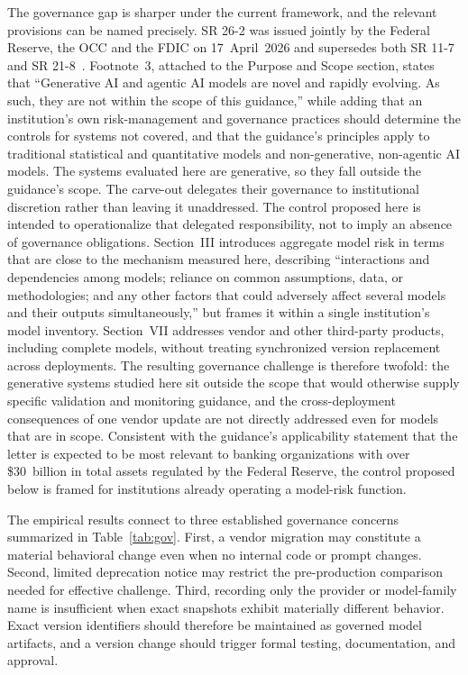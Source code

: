 \documentclass{ieeeaccess}
\begin{document}
The governance gap is sharper under the current framework, and the relevant provisions can be named precisely. SR 26-2 was issued jointly by the Federal Reserve, the OCC and the FDIC on 17~April~2026 and supersedes both SR 11-7 and SR 21-8~\cite{sr2602}. Footnote~3, attached to the Purpose and Scope section, states that ``Generative AI and agentic AI models are novel and rapidly evolving. As such, they are not within the scope of this guidance,'' while adding that an institution's own risk-management and governance practices should determine the controls for systems not covered, and that the guidance's principles apply to traditional statistical and quantitative models and non-generative, non-agentic AI models. The systems evaluated here are generative, so they fall outside the guidance's scope. The carve-out delegates their governance to institutional discretion rather than leaving it unaddressed. The control proposed here is intended to operationalize that delegated responsibility, not to imply an absence of governance obligations. Section~III introduces aggregate model risk in terms that are close to the mechanism measured here, describing ``interactions and dependencies among models; reliance on common assumptions, data, or methodologies; and any other factors that could adversely affect several models and their outputs simultaneously,'' but frames it within a single institution's model inventory. Section~VII addresses vendor and other third-party products, including complete models, without treating synchronized version replacement across deployments. The resulting governance challenge is therefore twofold: the generative systems studied here sit outside the scope that would otherwise supply specific validation and monitoring guidance, and the cross-deployment consequences of one vendor update are not directly addressed even for models that are in scope. Consistent with the guidance's applicability statement that the letter is expected to be most relevant to banking organizations with over \$30~billion in total assets regulated by the Federal Reserve, the control proposed below is framed for institutions already operating a model-risk function.

The empirical results connect to three established governance concerns summarized in Table~\ref{tab:gov}. First, a vendor migration may constitute a material behavioral change even when no internal code or prompt changes. Second, limited deprecation notice may restrict the pre-production comparison needed for effective challenge. Third, recording only the provider or model-family name is insufficient when exact snapshots exhibit materially different behavior. Exact version identifiers should therefore be maintained as governed model artifacts, and a version change should trigger formal testing, documentation, and approval.
\end{document}
